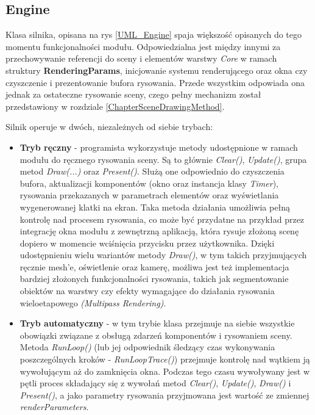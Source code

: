 	\vfill
	\clearpage
	
\subsection{Engine}
	Klasa silnika, opisana na rys \ref{UML_Engine} spaja większość opisanych do tego momentu funkcjonalności modułu. Odpowiedzialna jest między innymi za przechowywanie referencji do sceny i elementów warstwy \textit{Core} w ramach struktury \textbf{RenderingParams}, inicjowanie systemu renderującego oraz okna czy czyszczenie i prezentowanie bufora rysowania. Przede wszystkim odpowiada ona jednak za ostateczne rysowanie sceny, czego pełny mechanizm został przedstawiony w rozdziale \ref{ChapterSceneDrawingMethod}. 
	
	Silnik operuje w dwóch, niezależnych od siebie trybach:
	\begin{itemize}
		\item \textbf{Tryb ręczny} - programista wykorzystuje metody udostępnione w ramach modułu do ręcznego rysowania sceny. Są to głównie \textit{Clear()}, \textit{Update()}, grupa metod \textit{Draw(...)} oraz \textit{Present()}. Służą one odpowiednio do czyszczenia bufora, aktualizacji komponentów (okno oraz instancja klasy \textit{Timer}), rysowania przekazanych w parametrach elementów oraz wyświetlania wygenerowanej klatki na ekran. Taka metoda działania umożliwia pełną kontrolę nad procesem rysowania, co może być przydatne na przykład przez integrację okna modułu z zewnętrzną aplikacją, która rysuje złożoną scenę dopiero w momencie wciśnięcia przycisku przez użytkownika. Dzięki udostępnieniu wielu wariantów metody \textit{Draw()}, w tym takich przyjmujących ręcznie mesh'e, oświetlenie oraz kamerę, możliwa jest też implementacja bardziej złożonych funkcjonalności rysowania, takich jak segmentowanie obiektów na warstwy czy efekty wymagające do działania rysowania wieloetapowego \textit{(Multipass Rendering)}.
		\item \textbf{Tryb automatyczny} - w tym trybie klasa przejmuje na siebie wszystkie obowiązki związane z obsługą zdarzeń komponentów i rysowaniem sceny. Metoda \textit{RunLoop()} (lub jej odpowiednik śledzący czas wykonywania poszczególnych kroków - \textit{RunLoopTrace()}) przejmuje kontrolę nad wątkiem ją wywołującym aż do zamknięcia okna. Podczas tego czasu wywoływany jest w pętli proces składający się z wywołań metod \textit{Clear()}, \textit{Update()}, \textit{Draw()} i \textit{Present()}, a jako parametry rysowania przyjmowana jest wartość ze zmiennej \textit{renderParameters}.
	\end{itemize}
	

